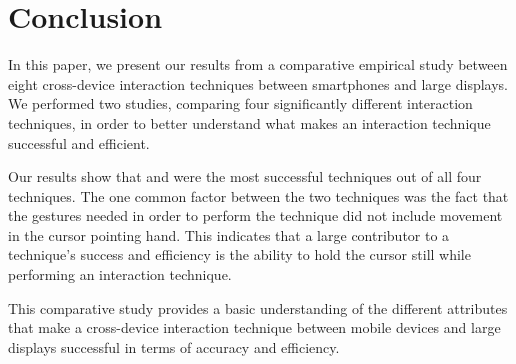 \section{Conclusion}\label{sec:conclusion}
In this paper, we present our results from a comparative empirical study between eight cross-device interaction techniques between smartphones and large displays. 
We performed two studies, comparing four significantly different interaction techniques, in order to better understand what makes an interaction technique successful and efficient. 

Our results show that \swipe and \throw were the most successful techniques out of all four techniques. 
The one common factor between the two techniques was the fact that the gestures needed in order to perform the technique did not include movement in the cursor pointing hand.
This indicates that a large contributor to a technique's success and efficiency is the ability to hold the cursor still while performing an interaction technique.

This comparative study provides a basic understanding of the different attributes that make a cross-device interaction technique between mobile devices and large displays successful in terms of accuracy and efficiency. 